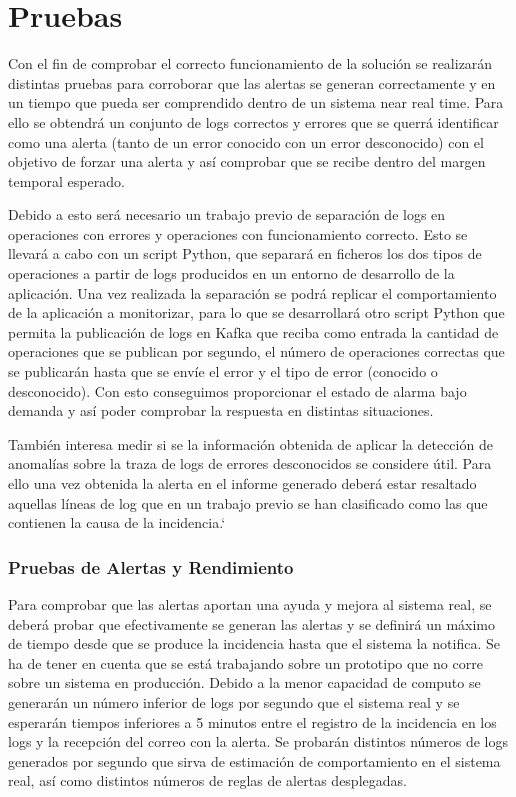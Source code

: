 \chapter{Pruebas}

Con el fin de comprobar el correcto funcionamiento de la solución se realizarán distintas pruebas para corroborar que las alertas se generan correctamente y en un tiempo que pueda ser comprendido dentro de un sistema near real time. Para ello se obtendrá un conjunto de logs correctos y errores que se querrá identificar como una alerta (tanto de un error conocido con un error desconocido) con el objetivo de forzar una alerta y así comprobar que se recibe dentro del margen temporal esperado.

Debido a esto será necesario un trabajo previo de separación de logs en operaciones con errores y operaciones con funcionamiento correcto. Esto se llevará a cabo con un script Python, que separará en ficheros los dos tipos de operaciones a partir de logs producidos en un entorno de desarrollo de la aplicación. Una vez realizada la separación se podrá replicar el comportamiento de la aplicación a monitorizar, para lo que se desarrollará otro script Python que permita la publicación de logs en Kafka que reciba como entrada la cantidad de operaciones que se publican por segundo, el número de operaciones correctas que se publicarán hasta que se envíe el error y el tipo de error (conocido o desconocido). Con esto conseguimos proporcionar el estado de alarma bajo demanda y así poder comprobar la respuesta en distintas situaciones.

También interesa medir si se la información obtenida de aplicar la detección de anomalías sobre la traza de logs de errores desconocidos se considere útil. Para ello una vez obtenida la alerta en el informe generado deberá estar resaltado aquellas líneas de log que en un trabajo previo se han clasificado como las que contienen la causa de la incidencia.`

\subsection{Pruebas de Alertas y Rendimiento}

Para comprobar que las alertas aportan una ayuda y mejora al sistema real, se deberá probar que efectivamente se generan las alertas y se definirá un máximo de tiempo desde que se produce la incidencia hasta que el sistema la notifica. Se ha de tener en cuenta que se está trabajando sobre un prototipo que no corre sobre un sistema en producción. Debido a la menor capacidad de computo se generarán un número inferior de logs por segundo que el sistema real y se esperarán tiempos inferiores a 5 minutos entre el registro de la incidencia en los logs y la recepción del correo con la alerta. Se probarán distintos números de logs generados por segundo que sirva de estimación de comportamiento en el sistema real, así como distintos números de reglas de alertas desplegadas.

